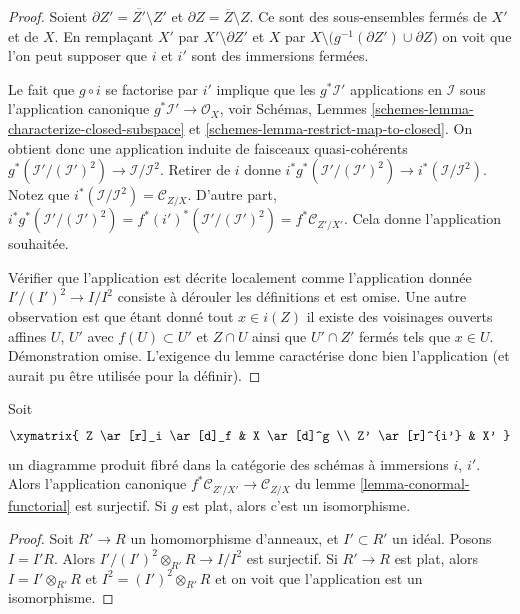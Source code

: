 \begin{proof}
Soient $\partial Z' = \overline{Z'} \setminus Z'$ et $\partial Z = \overline{Z} \setminus Z$. Ce sont
des sous-ensembles fermés de $X'$ et de $X$. En remplaçant
$X'$ par $X' \setminus \partial Z'$ et $X$ par
$X \setminus \big(g^{-1}(\partial Z') \cup \partial Z\big)$ on voit que l'on peut supposer que $i$
et $i'$ sont des immersions fermées.

\medskip\noindent
Le fait que $g \circ i$ se factorise
par $i'$ implique que les
$g^*\mathcal{I}'$ applications en
$\mathcal{I}$
sous l'application canonique $g^*\mathcal{I}' \to \mathcal{O}_X$,
voir Schémas, Lemmes
\ref{schemes-lemma-characterize-closed-subspace} et \ref{schemes-lemma-restrict-map-to-closed}. On
obtient donc une application induite de
faisceaux quasi-cohérents
$g^*(\mathcal{I}'/(\mathcal{I}')^2) \to \mathcal{I}/\mathcal{I}^2$. Retirer de $i$ donne
$i^*g^*(\mathcal{I}'/(\mathcal{I}')^2) \to i^*(\mathcal{I}/\mathcal{I}^2)$. Notez que $i^*(\mathcal{I}/\mathcal{I}^2) = \mathcal{C}_{Z/X}$.
D'autre part,
$i^*g^*(\mathcal{I}'/(\mathcal{I}')^2) =
f^*(i')^*(\mathcal{I}'/(\mathcal{I}')^2) = f^*\mathcal{C}_{Z'/X'}$. Cela donne l'application
souhaitée.

\medskip\noindent
Vérifier que l'application est décrite localement comme l'application
donnée $I'/(I')^2 \to I/I^2$ consiste à dérouler les définitions et
est omise. Une autre observation est que étant donné tout
$x \in i(Z)$ il existe des voisinages ouverts affines $U$,
$U'$ avec $f(U) \subset U'$ et $Z \cap U$ ainsi que $U' \cap Z'$ fermés
tels que $x \in U$. Démonstration omise. L’exigence du lemme
caractérise donc bien l’application (et aurait pu être utilisée pour
la définir).
\end{proof}

\begin{lemma}
\label{lemma-conormal-functorial-flat}
Soit
$$
\xymatrix{
Z \ar[r]_i \ar[d]_f & X \ar[d]^g \\
Z' \ar[r]^{i'} & X'
}
$$
un diagramme produit fibré dans la catégorie des schémas
à immersions $i$, $i'$.
Alors l'application canonique $f^*\mathcal{C}_{Z'/X'} \to \mathcal{C}_{Z/X}$ du
lemme \ref{lemma-conormal-functorial} est surjectif. Si
$g$ est plat, alors c'est un isomorphisme.
\end{lemma}

\begin{proof}
Soit $R' \to R$ un homomorphisme d'anneaux, et $I' \subset R'$
un idéal. Posons $I = I'R$. Alors $I'/(I')^2 \otimes_{R'} R \to I/I^2$ est
surjectif. Si $R' \to R$ est plat, alors $I = I' \otimes_{R'} R$ et
$I^2 = (I')^2 \otimes_{R'} R$ et on voit que l'application est un
isomorphisme.
\end{proof}

